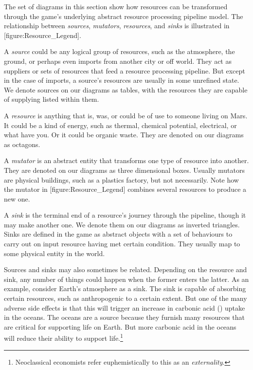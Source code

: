 
The set of diagrams in this section show how resources can be transformed through the game's underlying abstract resource processing pipeline model. The relationship between {\it sources}, {\it mutators}, {\it resources}, and {\it sinks} is illustrated in [figure:Resource_Legend].

    {}
    
A {\it source} could be any logical group of resources, such as the atmosphere, the ground, or perhaps even imports from another city or off world.  They act as suppliers or sets of resources that feed a resource processing pipeline. But except in the case of imports, a source's resources are usually in some unrefined state. We denote sources on our diagrams as tables, with the resources they are capable of supplying listed within them.

A {\it resource} is anything that is, was, or could be of use to someone living on Mars. It could be a kind of energy, such as thermal, chemical potential, electrical, or what have you. Or it could be organic waste. They are denoted on our diagrams as octagons.

A {\it mutator} is an abstract entity that transforms one type of resource into another. They are denoted on our diagrams as three dimensional boxes. Usually mutators are physical buildings, such as a plastics factory, but not necessarily. Note how the mutator in [figure:Resource_Legend] combines several resources to produce a new one.

A {\it sink} is the terminal end of a resource's journey through the pipeline, though it may make another one. We denote them on our diagrams as inverted triangles. Sinks are defined in the game as abstract objects with a set of behaviours to carry out on input resource having met certain condition. They usually map to some physical entity in the world. 

Sources and sinks may also sometimes be related. Depending on the resource and sink, any number of things could happen when the former enters the latter. As an example, consider Earth's atmosphere as a sink. The sink is capable of absorbing certain resources, such as anthropogenic  to a certain extent. But one of the many adverse side effects is that this will trigger an increase in carbonic acid () uptake in the oceans. The oceans are a source because they furnish many resources that are critical for supporting life on Earth. But more carbonic acid in the oceans will reduce their ability to support life.\footnote{Neoclassical economists refer euphemistically to this as an {\it externality}.} 

